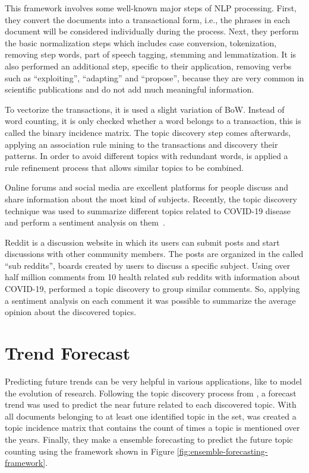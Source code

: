 This framework involves some well-known major steps of NLP processing. First, they convert the documents into a transactional form, i.e., the phrases in each document will be considered individually during the process. Next, they perform the basic normalization steps which includes case conversion, tokenization, removing step words, part of speech tagging, stemming and lemmatization. It is also performed an additional step, specific to their application, removing verbs such as ``exploiting'', ``adapting'' and ``propose'', because they are very common in scientific publications and do not add much meaningful information.

To vectorize the transactions, it is used a slight variation of BoW. Instead of word counting, it is only checked whether a word belongs to a transaction, this is called the binary incidence matrix. The topic discovery step comes afterwards, applying an association rule mining to the transactions and discovery their patterns. In order to avoid different topics with redundant words, is applied a rule refinement process that allows similar topics to be combined.

Online forums and social media are excellent platforms for people discuss and share information about the most kind of subjects. Recently, the topic discovery technique was used to summarize different topics related to COVID-19 disease and perform a sentiment analysis on them~\cite{jelodar2020deep}.

Reddit is a discussion website in which its users can submit posts and start discussions with other community members. The posts are organized in the called ``sub reddits'', boards created by users to discuss a specific subject. Using over half million comments from 10 health related sub reddits with information about COVID-19,  performed a topic discovery to group similar comments. So, applying a sentiment analysis on each comment it was possible to summarize the average opinion about the discovered topics.


\section{Trend Forecast}

Predicting future trends can be very helpful in various applications, like to model the evolution of research. Following the topic discovery process from , a forecast trend was used to predict the near future related to each discovered topic. With all documents belonging to at least one identified topic in the set, was created a topic incidence matrix that contains the count of times a topic is mentioned over the years. Finally, they make a ensemble forecasting to predict the future topic counting using the framework shown in Figure \ref{fig:ensemble-forecasting-framework}.

